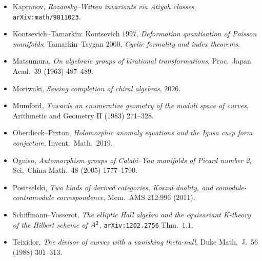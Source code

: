 \documentclass[11pt]{amsart}
\begin{document}
\begin{itemize}[leftmargin=2em]
Math.\ J.\ 46 (1979) 685--724.
\item Kapranov, \emph{Rozansky--Witten invariants via Atiyah
classes}, \texttt{arXiv:math/9811023}.
\item Kontsevich--Tamarkin: Kontsevich $1997$, \emph{Deformation
quantisation of Poisson manifolds}; Tamarkin--Tsygan $2000$,
\emph{Cyclic formality and index theorems}.
\item Matsumura, \emph{On algebraic groups of birational
transformations}, Proc.\ Japan Acad.\ 39 (1963) 487--489.
\item Moriwaki, \emph{Sewing completion of chiral algebras},
$2026$.
\item Mumford, \emph{Towards an enumerative geometry of the moduli
space of curves}, Arithmetic and Geometry II (1983) 271--328.
\item Oberdieck--Pixton, \emph{Holomorphic anomaly equations and the
Igusa cusp form conjecture}, Invent.\ Math.\ $2019$.
\item Oguiso, \emph{Automorphism groups of Calabi--Yau manifolds of
Picard number 2}, Sci.\ China Math.\ 48 (2005) 1777--1790.
\item Positselski, \emph{Two kinds of derived categories, Koszul
duality, and comodule-contramodule correspondence},
Mem.\ AMS 212:$996$ ($2011$).
\item Schiffmann--Vasserot, \emph{The elliptic Hall algebra and the
equivariant K-theory of the Hilbert scheme of $A^2$},
\texttt{arXiv:1202.2756} Thm.~$1.1$.
\item Teixidor, \emph{The divisor of curves with a vanishing
theta-null}, Duke Math.\ J.\ 56 (1988) 301--313.
\end{itemize}
\end{document}
